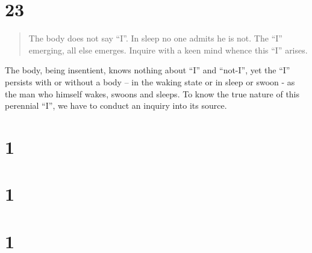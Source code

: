 \documentclass[12pt]{report}
\begin{document}
\begin{quote}

\end{quote}




\section{23}

\begin{quote}
The body does not say ``I''. In sleep no one admits he is not. The
``I'' emerging, all else emerges. Inquire with a keen mind whence this
``I'' arises.
\end{quote}

The body, being insentient, knows nothing about ``I'' and ``not-I'',
yet the ``I'' persists with or without a body -- in the waking state
or in sleep or swoon - as the man who himself wakes, swoons and
sleeps. To know the true nature of this perennial ``I'', we have to
conduct an inquiry into its source.


\section{1}

\begin{quote}

\end{quote}


\section{1}

\begin{quote}

\end{quote}


\section{1}

\begin{quote}

\end{quote}
\end{document}
